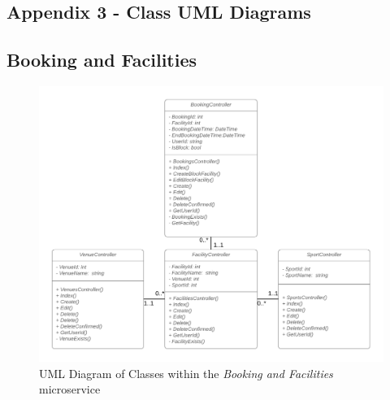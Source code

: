 \fancyhf{}
\renewcommand{\headrulewidth}{0pt}

\begin{landscape}


\section{Appendix 3 - Class UML Diagrams}
\label{Appendix_3}
\subsection{Booking and Facilities}
\begin{figure}[H]
    \centering
    \includegraphics[width=\textwidth]{Images/class_uml/booking_facilities.png}
    \caption{UML Diagram of Classes within the \textit{Booking and Facilities} microservice}
    \label{fig:class_uml:booking-facilities}
\end{figure}

\end{landscape}
